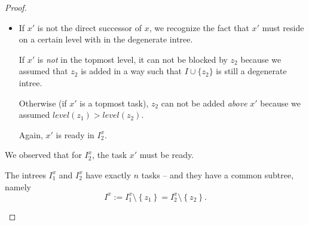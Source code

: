 \begin{proof}
\begin{itemize}
\begin{itemize}
    \item If $x'$ is not the direct successor of $x$, we recognize the fact that $x'$ must reside on a certain level with in the degenerate intree. 

      If $x'$ is \emph{not} in the topmost level, it can not be blocked by $z_2$ because we assumed that $z_2$ is added in a way such that $I\cup\{z_2\}$ is still a degenerate intree.

      Otherwise (if $x'$ is a topmost task), $z_2$ can not be added \emph{above} $x'$ because we assumed $level(z_1)>level(z_2)$.

      Again, $x'$ is ready in $I_2^x$.

    \end{itemize}
    We observed that for $I_2^x$, the task $x'$ must be ready.
    
    The intrees $I^x_{1}$ and $I^x_{2}$ have exactly $n$ tasks -- and they have a common subtree, namely
    \begin{equation*}
      I^x := I^x_{1}\setminus\left\{ z_1 \right\}=I^x_{2}\setminus\left\{ z_2 \right\}.
    \end{equation*}


\end{itemize}
\end{proof}
